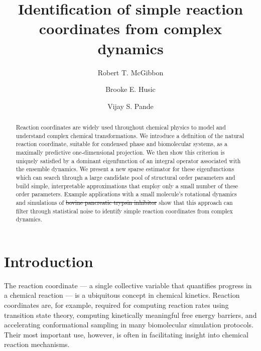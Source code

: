 \documentclass[aip, jcp, reprint, nolinenumbers, twocolumn, nobalancelastpage]{revtex4-1} %
\providecommand{\DIFaddtex}[1]{{\protect\color{blue}\uwave{#1}}} %
\providecommand{\DIFdeltex}[1]{{\protect\color{red}\sout{#1}}}                      %
\providecommand{\DIFaddbegin}{} %
\providecommand{\DIFaddend}{} %
\providecommand{\DIFdelbegin}{} %
\providecommand{\DIFdelend}{} %
\providecommand{\DIFadd}[1]{\texorpdfstring{\DIFaddtex{#1}}{#1}} %
\providecommand{\DIFdel}[1]{\texorpdfstring{\DIFdeltex{#1}}{}} %
\begin{document}
\title{Identification of simple reaction coordinates from complex dynamics}
\author{Robert T. McGibbon}
\author{Brooke E. Husic}
\author{Vijay S. Pande}

\begin{abstract}
Reaction coordinates are widely used throughout chemical physics to model and understand complex chemical transformations. We introduce a definition of the natural reaction coordinate, suitable for condensed phase and biomolecular systems, as a maximally predictive one-dimensional projection. We then show this criterion is uniquely satisfied by a dominant eigenfunction of an integral operator associated with the ensemble dynamics. We present a new sparse estimator for these eigenfunctions which can search through a large candidate pool of structural order parameters and build simple, interpretable approximations that employ only a small number of these order parameters. Example applications with a small molecule's rotational dynamics and simulations of \DIFdelbegin \DIFdel{bovine pancreatic trypsin inhibitor }\DIFdelend \DIFaddbegin \DIFadd{protein conformational change and folding }\DIFaddend show that this approach can filter through statistical noise to identify simple reaction coordinates from complex dynamics.
\end{abstract}
\maketitle


\section{Introduction}

The reaction coordinate --- a single collective variable that quantifies progress in a chemical reaction ---  is a ubiquitous concept in chemical kinetics.\cite{eyring1935activated, KRAMERS1940284} Reaction coordinates are, for example, required for computing reaction rates using transition state theory,\cite{eyring1935activated, KRAMERS1940284, truhlar1996current} computing kinetically meaningful free energy barriers,\cite{sichun2006effective} and accelerating conformational sampling in many biomolecular simulation protocols.\cite{Bernardi2015Enhanced, laio2002escaping, kastner2011umbrella, knight2009lambda, Torrie1977187} Their most important use, however, is often in facilitating insight into chemical reaction mechanisms.\cite{steinfeld1999chemical, RevModPhys.62.251, peters2015common}
\end{document}
